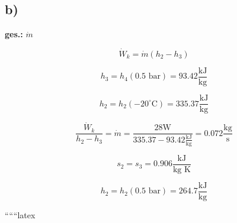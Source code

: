 

\subsection*{b)}

\textbf{ges.:} $\dot{m}$

\[
\dot{W}_k = \dot{m} (h_2 - h_3)
\]

\[
h_3 = h_4 (0.5 \text{ bar}) = 93.42 \frac{\text{kJ}}{\text{kg}}
\]

\[
h_2 = h_2 (-20^\circ \text{C}) = 335.37 \frac{\text{kJ}}{\text{kg}}
\]

\[
\frac{\dot{W}_k}{h_2 - h_3} = \dot{m} = \frac{28 \text{W}}{335.37 - 93.42 \frac{\text{kJ}}{\text{kg}}} = 0.072 \frac{\text{kg}}{\text{s}}
\]

\[
s_2 = s_3 = 0.906 \frac{\text{kJ}}{\text{kg K}}
\]

\[
h_2 = h_2 (0.5 \text{ bar}) = 264.7 \frac{\text{kJ}}{\text{kg}}
\]

``````latex